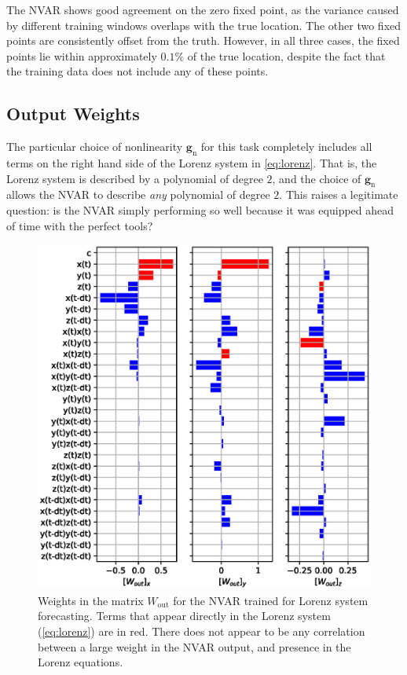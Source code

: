 The NVAR shows good agreement on the zero fixed point, as the variance
caused by different training windows overlaps with the true
location. The other two fixed points are consistently offset from the
truth. However, in all three cases, the fixed points lie within
approximately $0.1\%$ of the true location, despite the fact that the
training data does not include any of these points.

\subsection{Output Weights}

The particular choice of nonlinearity $\bm{g}_\text{n}$ for this task
completely includes all terms on the right hand side of the Lorenz
system in \cref{eq:lorenz}. That is, the Lorenz system is described by
a polynomial of degree $2$, and the choice of $\bm{g}_\text{n}$ allows
the NVAR to describe \emph{any} polynomial of degree $2$. This raises
a legitimate question: is the NVAR simply performing so well because
it was equipped ahead of time with the perfect tools?

\begin{figure}
  \includegraphics{figures/nvar-predict-lorenz-wout}
  \caption{Weights in the matrix $W_\text{out}$ for the NVAR trained
    for Lorenz system forecasting. Terms that appear directly in the
    Lorenz system (\cref{eq:lorenz}) are in red. There does not appear
    to be any correlation between a large weight in the NVAR output,
    and presence in the Lorenz equations.}
  \label{fig:nvar-predict-lorenz-wout}
\end{figure}

